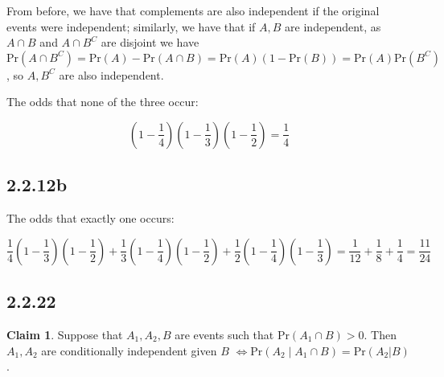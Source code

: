 \documentclass[12pt,letterpaper]{article}
\theoremstyle{definition}
\newtheorem*{claim}{Claim}
\newcommand{\pr}[1]{\text{Pr}\left(#1\right)}
\begin{document}
From before, we have that complements are also independent if the original
events were independent; similarly, we have that if $A, B$ are independent, as $A
\cap B$ and $A \cap B^C$ are disjoint we have $\pr{A \cap B^C} = \pr{A} - \pr{A
  \cap B} = \pr{A}(1 - \pr{B}) = \pr{A}\pr{B^C}$, so $A, B^C$ are also
independent.

The odds that none of the three occur:

\[
  (1 - \frac{1}{4})(1 - \frac{1}{3})(1 - \frac{1}{2}) = \frac{1}{4}
\]

\subsection*{2.2.12b}

The odds that exactly one occurs:

\[
  \frac{1}{4}(1 - \frac{1}{3})(1 - \frac{1}{2}) + \frac{1}{3}(1 - \frac{1}{4})(1 -
  \frac{1}{2}) + \frac{1}{2}(1 - \frac{1}{4})(1 - \frac{1}{3}) = \frac{1}{12} +
  \frac{1}{8} + \frac{1}{4} = \frac{11}{24}
\]

\subsection*{2.2.22}

\begin{claim}
  Suppose that $A_1, A_2, B$ are events such that $\pr{A_1 \cap B} > 0$. Then
  $A_1, A_2$ are conditionally independent given $B$ $\iff \pr{A_2 \mid A_1 \cap
  B} = \pr{A_2 | B}$. 
\end{claim}
\end{document}
